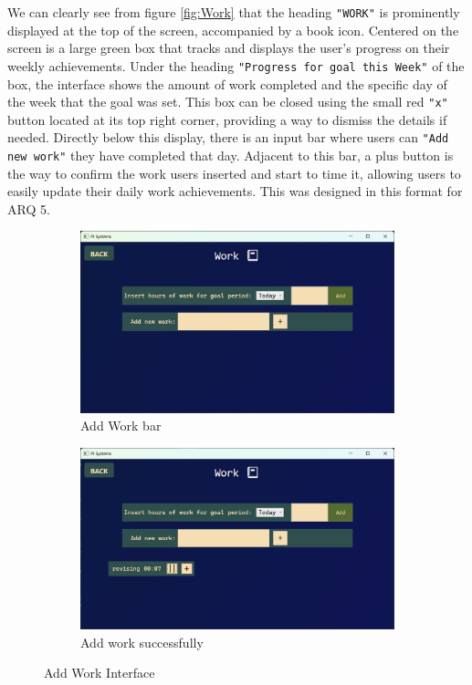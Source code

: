 \documentclass[11pt]{article}
\begin{document}
We can clearly see from figure \ref{fig:Work} that the heading \texttt{"WORK"} is
prominently displayed at the top of the screen, accompanied by a book icon. Centered on the screen is a large green box that
tracks and displays the user's progress on their weekly achievements. Under
the heading \texttt{"Progress for goal this Week"} of the box, the interface
shows the amount of work completed and the specific day of the week that the goal was
set. This box can be closed using the small red \texttt{"x"} button located at
its top right corner, providing a way to dismiss the details if needed. Directly
below this display, there is an input bar where users can \texttt{"Add new work"}
they have completed that day. Adjacent to this bar, a plus button is the way to
confirm the work users inserted and start to time it, allowing users to easily
update their daily work achievements. This was designed in this format for ARQ 5.\par

\begin{figure}[!ht]
  \centering
  \begin{subfigure}{0.4\linewidth}
    \includegraphics[width=\linewidth]{Add Work}
    \caption{Add Work bar}
    \label{fig:Add_Work}
  \end{subfigure}
  \hfill
  \begin{subfigure}{0.4\linewidth}
    \includegraphics[width=\linewidth]{Add Work 2}
    \caption{Add work successfully}
    \label{fig:Add_Work_2}
  \end{subfigure}
  \caption{Add Work Interface}
  \label{fig:Work_Interface}
\end{figure}
\end{document}
